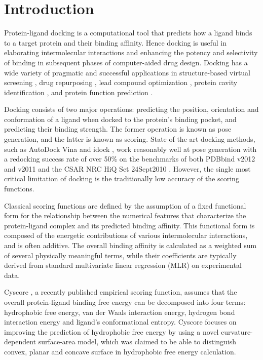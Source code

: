 \section{Introduction}

Protein-ligand docking is a computational tool that predicts how a ligand binds to a target protein and their binding affinity. Hence docking is useful in elaborating intermolecular interactions and enhancing the potency and selectivity of binding in subsequent phases of computer-aided drug design. Docking has a wide variety of pragmatic and successful applications in structure-based virtual screening \citep{1383}, drug repurposing \citep{1384}, lead compound optimization \citep{1385}, protein cavity identification \citep{1217}, and protein function prediction \citep{1386}.

Docking consists of two major operations: predicting the position, orientation and conformation of a ligand when docked to the protein's binding pocket, and predicting their binding strength. The former operation is known as pose generation, and the latter is known as scoring. State-of-the-art docking methods, such as AutoDock Vina \citep{595} and idock \citep{1153}, work reasonably well at pose generation with a redocking success rate of over 50\% \citep{1362} on the benchmarks of both PDBbind v2012 and v2011 \citep{529,530} and the CSAR NRC HiQ Set 24Sept2010 \citep{857,960}. However, the single most critical limitation of docking is the traditionally low accuracy of the scoring functions.

Classical scoring functions are defined by the assumption of a fixed functional form for the relationship between the numerical features that characterize the protein-ligand complex and its predicted binding affinity. This functional form is composed of the energetic contributions of various intermolecular interactions, and is often additive. The overall binding affinity is calculated as a weighted sum of several physically meaningful terms, while their coefficients are typically derived from standard multivariate linear regression (MLR) on experimental data.

Cyscore \citep{1372}, a recently published empirical scoring function, assumes that the overall protein-ligand binding free energy can be decomposed into four terms: hydrophobic free energy, van der Waals interaction energy, hydrogen bond interaction energy and ligand's conformational entropy. Cyscore focuses on improving the prediction of hydrophobic free energy by using a novel curvature-dependent surface-area model, which was claimed to be able to distinguish convex, planar and concave surface in hydrophobic free energy calculation.

